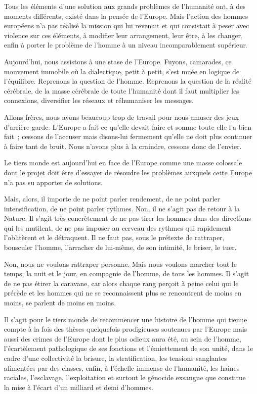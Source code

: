 \documentclass[french,twoside]{book} %
\begin{document}
Tous les éléments d’une solution aux grands problèmes de l’humanité ont, à des moments différents, existé dans la pensée de l’Europe. Mais l’action des hommes européens n’a pas réalisé la mission qui lui revenait et qui consistait à peser avec violence sur ces éléments, à modifier leur arrangement, leur être, à les changer, enfin à porter le problème de l’homme à un niveau incomparablement supérieur.\par
Aujourd’hui, nous assistons à une stase de l’Europe. Fuyons, camarades, ce mouvement immobile où la dialectique, petit à petit, s’est muée en logique de l’équilibre. Reprenons la question de l’homme. Reprenons la question de la réalité cérébrale, de la masse cérébrale de toute l’humanité dont il faut multiplier les connexions, diversifier les réseaux et réhumaniser les messages.\par
Allons frères, nous avons beaucoup trop de travail pour nous amuser des jeux d’arrière-garde. L’Europe a fait ce qu’elle devait faire et somme toute elle l’a bien fait ; cessons de l’accuser mais   disons-lui fermement qu’elle ne doit plus continuer à faire tant de bruit. Nous n’avons plus à la craindre, cessons donc de l’envier.\par
Le tiers monde est aujourd’hui en face de l’Europe comme une masse colossale dont le projet doit être d’essayer de résoudre les problèmes auxquels cette Europe n’a pas su apporter de solutions.\par
Mais, alors, il importe de ne point parler rendement, de ne point parler intensification, de ne point parler rythmes. Non, il ne s’agit pas de retour à la Nature. Il s’agit très concrètement de ne pas tirer les hommes dans des directions qui les mutilent, de ne pas imposer au cerveau des rythmes qui rapidement l’oblitèrent et le détraquent. Il ne faut pas, sous le prétexte de rattraper, bousculer l’homme, l’arracher de lui-même, de son intimité, le briser, le tuer.\par
Non, nous ne voulons rattraper personne. Mais nous voulons marcher tout le temps, la nuit et le jour, en compagnie de l’homme, de tous les hommes. Il s’agit de ne pas étirer la caravane, car alors chaque rang perçoit à peine celui qui le précède et les hommes qui ne se reconnaissent plus se rencontrent de moins en moins, se parlent de moins en moins.\par
Il s’agit pour le tiers monde de recommencer une histoire de l’homme qui tienne compte à la fois des thèses quelquefois prodigieuses soutenues par l’Europe mais aussi des crimes de l’Europe dont le plus odieux aura été, au sein de l’homme, l’écartèlement pathologique de ses fonctions et l’émiettement de son unité, dans le cadre d’une collectivité la brisure, la stratification, les tensions sanglantes alimentées par des classes, enfin, à l’échelle immense de l’humanité, les haines raciales, l’esclavage, l’exploitation et surtout le génocide exsangue que constitue la mise à l’écart d’un milliard et demi d’hommes.\par
\end{document}
